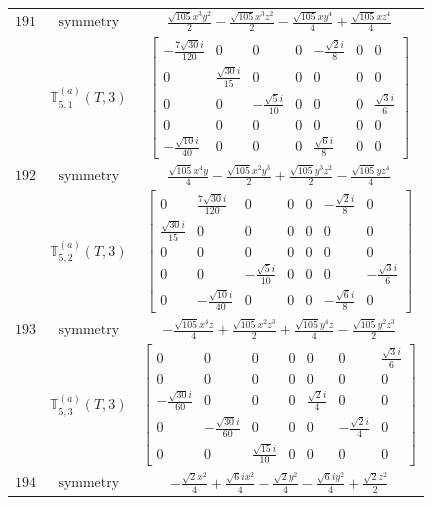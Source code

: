 \documentclass[fleqn,8pt,landscape]{jsarticle}
\begin{document}
\begin{longtable}{ccc}
$ 191 $ & $ \text{symmetry} $ & $ \frac{\sqrt{105} x^{3} y^{2}}{2} - \frac{\sqrt{105} x^{3} z^{2}}{2} - \frac{\sqrt{105} x y^{4}}{4} + \frac{\sqrt{105} x z^{4}}{4} $ \\
$  $ & $ \mathbb{T}_{5,1}^{(a)}(T,3) $ & $ \begin{bmatrix} - \frac{7 \sqrt{30} i}{120} & 0 & 0 & 0 & - \frac{\sqrt{2} i}{8} & 0 & 0 \\ 0 & \frac{\sqrt{30} i}{15} & 0 & 0 & 0 & 0 & 0 \\ 0 & 0 & - \frac{\sqrt{5} i}{10} & 0 & 0 & 0 & \frac{\sqrt{3} i}{6} \\ 0 & 0 & 0 & 0 & 0 & 0 & 0 \\ - \frac{\sqrt{10} i}{40} & 0 & 0 & 0 & \frac{\sqrt{6} i}{8} & 0 & 0 \end{bmatrix} $ \\ \hline
$ 192 $ & $ \text{symmetry} $ & $ \frac{\sqrt{105} x^{4} y}{4} - \frac{\sqrt{105} x^{2} y^{3}}{2} + \frac{\sqrt{105} y^{3} z^{2}}{2} - \frac{\sqrt{105} y z^{4}}{4} $ \\
$  $ & $ \mathbb{T}_{5,2}^{(a)}(T,3) $ & $ \begin{bmatrix} 0 & \frac{7 \sqrt{30} i}{120} & 0 & 0 & 0 & - \frac{\sqrt{2} i}{8} & 0 \\ \frac{\sqrt{30} i}{15} & 0 & 0 & 0 & 0 & 0 & 0 \\ 0 & 0 & 0 & 0 & 0 & 0 & 0 \\ 0 & 0 & - \frac{\sqrt{5} i}{10} & 0 & 0 & 0 & - \frac{\sqrt{3} i}{6} \\ 0 & - \frac{\sqrt{10} i}{40} & 0 & 0 & 0 & - \frac{\sqrt{6} i}{8} & 0 \end{bmatrix} $ \\ \hline
$ 193 $ & $ \text{symmetry} $ & $ - \frac{\sqrt{105} x^{4} z}{4} + \frac{\sqrt{105} x^{2} z^{3}}{2} + \frac{\sqrt{105} y^{4} z}{4} - \frac{\sqrt{105} y^{2} z^{3}}{2} $ \\
$  $ & $ \mathbb{T}_{5,3}^{(a)}(T,3) $ & $ \begin{bmatrix} 0 & 0 & 0 & 0 & 0 & 0 & \frac{\sqrt{3} i}{6} \\ 0 & 0 & 0 & 0 & 0 & 0 & 0 \\ - \frac{\sqrt{30} i}{60} & 0 & 0 & 0 & \frac{\sqrt{2} i}{4} & 0 & 0 \\ 0 & - \frac{\sqrt{30} i}{60} & 0 & 0 & 0 & - \frac{\sqrt{2} i}{4} & 0 \\ 0 & 0 & \frac{\sqrt{15} i}{10} & 0 & 0 & 0 & 0 \end{bmatrix} $ \\ \hline
$ 194 $ & $ \text{symmetry} $ & $ - \frac{\sqrt{2} x^{2}}{4} + \frac{\sqrt{6} i x^{2}}{4} - \frac{\sqrt{2} y^{2}}{4} - \frac{\sqrt{6} i y^{2}}{4} + \frac{\sqrt{2} z^{2}}{2} $ \\

\end{longtable}
\end{document}
